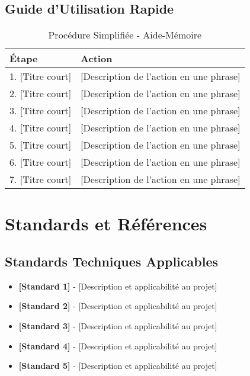 \subsection{Guide d'Utilisation Rapide}

\begin{table}[H]
\centering
\caption{Procédure Simplifiée - Aide-Mémoire}
\label{tab:quick-guide}
\begin{tabular}{|p{}|p{}|}
\hline
\rowcolor{DollaramaGreen!30}
\textbf{\color{white}Étape} & \textbf{\color{white}Action} \\
\hline
1. [Titre court] & [Description de l'action en une phrase] \\
\hline
\rowcolor{gray!10}
2. [Titre court] & [Description de l'action en une phrase] \\
\hline
3. [Titre court] & [Description de l'action en une phrase] \\
\hline
\rowcolor{gray!10}
4. [Titre court] & [Description de l'action en une phrase] \\
\hline
5. [Titre court] & [Description de l'action en une phrase] \\
\hline
\rowcolor{gray!10}
6. [Titre court] & [Description de l'action en une phrase] \\
\hline
7. [Titre court] & [Description de l'action en une phrase] \\
\hline
\end{tabular}
\end{table}

\section{Standards et Références}
\label{app:standards}

\subsection{Standards Techniques Applicables}

\begin{itemize}
\item \textbf{[Standard 1]} - [Description et applicabilité au projet]
\item \textbf{[Standard 2]} - [Description et applicabilité au projet]
\item \textbf{[Standard 3]} - [Description et applicabilité au projet]
\item \textbf{[Standard 4]} - [Description et applicabilité au projet]
\item \textbf{[Standard 5]} - [Description et applicabilité au projet]
\end{itemize}

